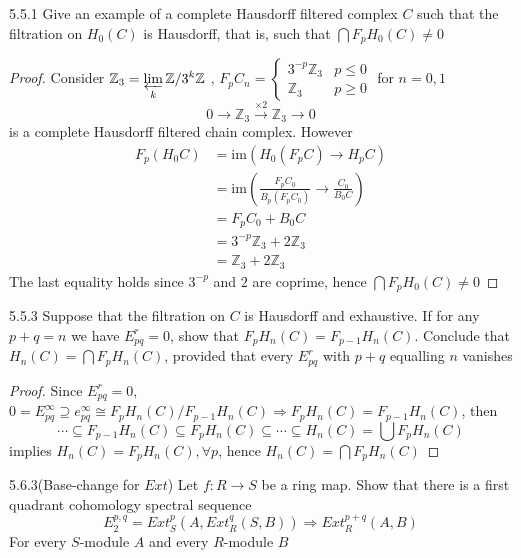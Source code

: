 \documentclass[../main.tex]{subfiles}
\begin{document}
\begin{customexercise}{5.5.1}
Give an example of a complete Hausdorff filtered complex $C$ such that the filtration on $H_0(C)$ is Hausdorff, that is, such that $\bigcap F_pH_0(C)\neq0$
\end{customexercise}

\begin{proof}
Consider $\displaystyle\mathbb Z_3=\varprojlim_k\mathbb Z/3^k\mathbb Z$ , $F_pC_n=\begin{cases}
3^{-p}\mathbb Z_3 &p\leq0 \\
\mathbb Z_3 &p\geq0
\end{cases}$ for $n=0,1$
\[0\to\mathbb Z_3\xrightarrow{\times2}\mathbb Z_3\to0\]
is a complete Hausdorff filtered chain complex. However
\begin{align*}
F_p(H_0C)&=\mathrm{im}(H_0(F_pC)\to H_pC) \\
&=\mathrm{im}\left(\frac{F_pC_0}{B_p(F_pC_0)}\to \frac{C_0}{B_0C}\right) \\
&=F_pC_0+B_0C \\
&=3^{-p}\mathbb Z_3+2\mathbb Z_3 \\
&=\mathbb Z_3+2\mathbb Z_3
\end{align*}
The last equality holds since $3^{-p}$ and $2$ are coprime, hence $\bigcap F_pH_0(C)\neq0$
\end{proof}

\begin{customexercise}{5.5.3}
Suppose that the filtration on $C$ is Hausdorff and exhaustive. If for any $p+q=n$ we have $E^r_{pq}=0$, show that $F_pH_n(C)=F_{p-1}H_n(C)$. Conclude that $H_n(C)=\bigcap F_pH_n(C)$, provided that every $E^r_{pq}$ with $p+q$ equalling $n$ vanishes
 \end{customexercise}

\begin{proof}
Since $E^r_{pq}=0$, $0=E^\infty_{pq}\supseteq e^\infty_{pq}\cong F_pH_n(C)/F_{p-1}H_n(C)\Rightarrow F_pH_n(C)=F_{p-1}H_n(C)$, then 
\[\cdots\subseteq F_{p-1}H_n(C)\subseteq F_pH_n(C)\subseteq\cdots\subseteq H_n(C)=\bigcup F_pH_n(C)\]
implies $H_n(C)=F_pH_n(C), \forall p$, hence $H_n(C)=\bigcap F_pH_n(C)$
\end{proof}

\begin{customexercise}{5.6.3}(Base-change for $Ext$)
Let $f:R\to S$ be a ring map. Show that there is a first quadrant cohomology spectral sequence
\[E^{p,q}_2=Ext_S^p(A,Ext^q_R(S,B))\Rightarrow Ext_R^{p+q}(A,B)\]
For every $S$-module $A$ and every $R$-module $B$
\end{customexercise}
\end{document}
